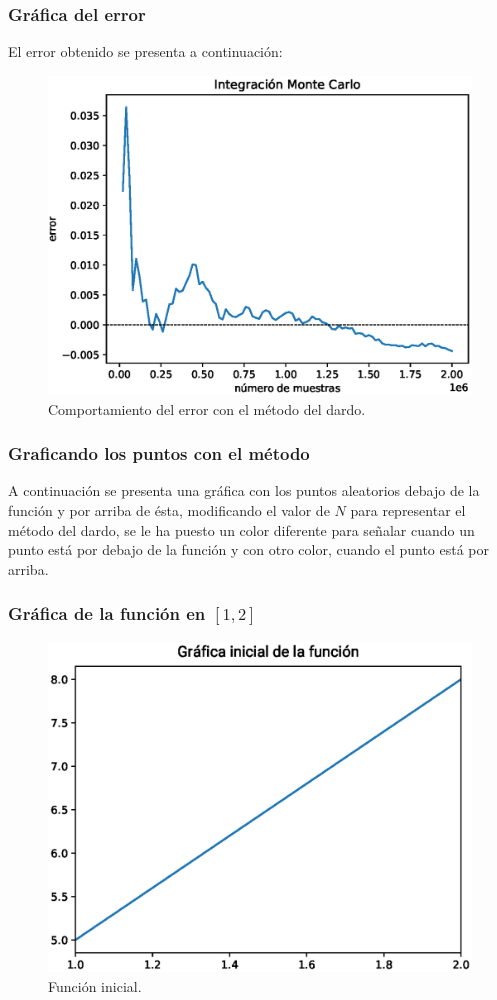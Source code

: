 \begin{frame}[fragile]
\frametitle{Gráfica del error}
El error obtenido se presenta a continuación:
\begin{figure}[h!]
    \centering
    \includegraphics[scale=0.45]{Imagenes/integracion_area_01.eps}
    \caption{Comportamiento del error con el método del dardo.}
\end{figure}
\end{frame}
\begin{frame}
\frametitle{Graficando los puntos con el método}
A continuación se presenta una gráfica con los puntos aleatorios debajo de la función y por arriba de ésta, modificando el valor de $N$ para representar el método del dardo, se le ha puesto un color diferente para señalar cuando un punto está por debajo de la función y con otro color, cuando el punto está por arriba.
\end{frame}
\begin{frame}
\frametitle{Gráfica de la función en $[1, 2]$}
\begin{figure}[h!]
	\centering
	\includegraphics[scale=0.55]{Imagenes/area_puntos_01.eps}
    \caption{Función inicial.}
\end{figure}
\end{frame}
